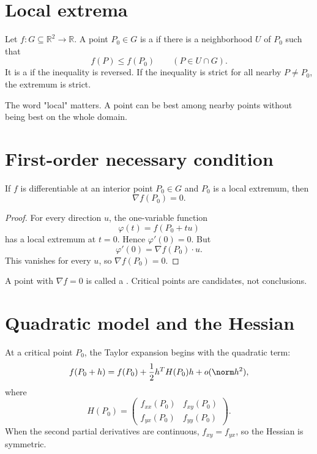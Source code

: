 
\section{Local extrema}

Let \(f:G\subseteq\mathbb R^2\to\mathbb R\).  A point \(P_0\in G\) is a  if there is a neighborhood \(U\) of \(P_0\) such that
\[
  f(P)\le f(P_0)\qquad(P\in U\cap G).
\]
It is a  if the inequality is reversed.  If the inequality is strict for all nearby \(P\ne P_0\), the extremum is strict.

The word "local" matters.  A point can be best among nearby points without being best on the whole domain.

\section{First-order necessary condition}

\begin{theorem}
If \(f\) is differentiable at an interior point \(P_0\in G\) and \(P_0\) is a local extremum, then
\[
  \nabla f(P_0)=0.
\]
\end{theorem}

\begin{proof}
For every direction \(u\), the one-variable function
\[
  \varphi(t)=f(P_0+tu)
\]
has a local extremum at \(t=0\).  Hence \(\varphi'(0)=0\).  But
\[
  \varphi'(0)=\nabla f(P_0)\cdot u.
\]
This vanishes for every \(u\), so \(\nabla f(P_0)=0\).
\end{proof}

A point with \(\nabla f=0\) is called a .  Critical points are candidates, not conclusions.

\section{Quadratic model and the Hessian}

At a critical point \(P_0\), the Taylor expansion begins with the quadratic term:
\[
  f(P_0+h)=f(P_0)+\frac12 h^T H(P_0)h+o(\norm h^2),
\]
where
\[
  H(P_0)=
  \begin{pmatrix}
  f_{xx}(P_0)&f_{xy}(P_0)\\
  f_{yx}(P_0)&f_{yy}(P_0)
  \end{pmatrix}.
\]
When the second partial derivatives are continuous, \(f_{xy}=f_{yx}\), so the Hessian is symmetric.

